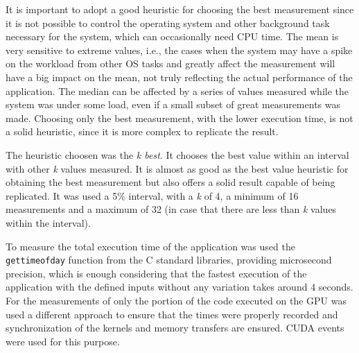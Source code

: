 It is important to adopt a good heuristic for choosing the best measurement since it is not possible to control the operating system and other background task necessary for the system, which can occasionally need CPU time. The mean is very sensitive to extreme values, i.e., the cases when the system may have a spike on the workload from other OS tasks and greatly affect the measurement will have a big impact on the mean, not truly reflecting the actual performance of the application. The median can be affected by a series of values measured while the system was under some load, even if a small subset of great measurements was made. Choosing only the best measurement, with the lower execution time, is not a solid heuristic, since it is more complex to replicate the result.

The heuristic choosen was the \textit{k best}. It chooses the best value within an interval with other \textit{k} values measured. It is almost as good as the best value heuristic for obtaining the best measurement but also offers a solid result capable of being replicated. It was used a 5\% interval, with a \textit{k} of 4, a minimum of 16 measurements and a maximum of 32 (in case that there are less than \textit{k} values within the interval).

To measure the total execution time of the application was used the \texttt{gettimeofday} function from the C standard libraries, providing microsecond precision, which is enough considering that the fastest execution of the application with the defined inputs without any variation takes around 4 seconds. For the measurements of only the portion of the code executed on the GPU was used a different approach to ensure that the times were properly recorded and synchronization of the kernels and memory transfers are ensured. CUDA events were used for this purpose.